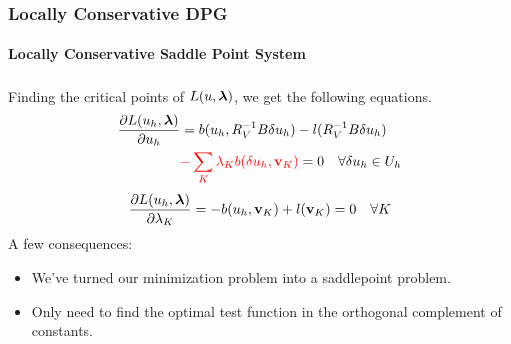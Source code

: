 \documentclass[18pt,xcolor=table]{beamer}
\begin{document}

\begin{frame}
\frametitle{Locally Conservative DPG}
\framesubtitle{Locally Conservative Saddle Point System}
Finding the critical points of $L(u,\boldsymbol\lambda)$, we get the following
equations\textsuperscript{\cite{EllisDemkowiczChan2013}}.
\begin{align*}
\frac{\partial L(u_h,\boldsymbol\lambda)}{\partial u_h}&=b(u_h,R_V^{-1}B\delta u_h)
-l(R_V^{-1}B\delta u_h)\\
&{\color{red}-\sum_K\lambda_K b(\delta
u_h,\mathbf{v}_K)}=0\quad\forall\delta u_h\in U_h
\end{align*}
\[
\frac{\partial
L(u_h,\boldsymbol\lambda)}{\partial\lambda_K}=-b(u_h,\mathbf{v}_K)+l(\mathbf{v}_K)=0\quad\forall
K
\]
A few consequences:
\begin{itemize}
\item We've turned our minimization problem into a saddlepoint problem.
\item Only need to find the optimal test function in the orthogonal complement
of constants. %
\end{itemize}
\end{frame}

\end{document}
